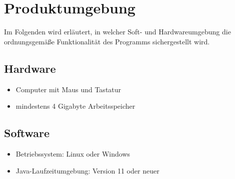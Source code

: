 \section{Produktumgebung}

Im Folgenden wird erläutert, in welcher Soft- und Hardwareumgebung die ordnungsgemäße Funktionalität des Programms sichergestellt wird.

\subsection{Hardware}
\begin{itemize}
\item Computer mit Maus und Tastatur
\item mindestens 4 Gigabyte Arbeitsspeicher
\end{itemize}

\subsection{Software}
\begin{itemize}
\item Betriebssystem: Linux oder Windows 
\item Java-Laufzeitumgebung: Version 11 oder neuer
\end{itemize}
